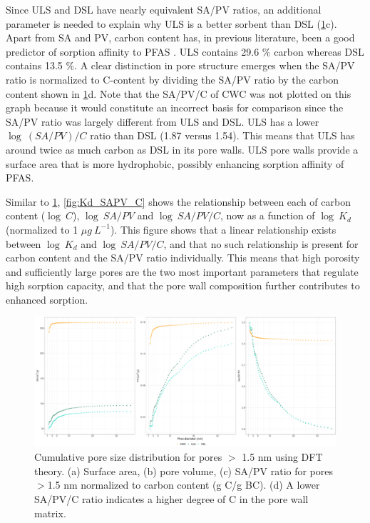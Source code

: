 Since ULS and DSL have nearly equivalent SA/PV ratios, an additional parameter is needed to explain why ULS is a better sorbent than DSL (\cref{fig:PZD_large}c). Apart from SA and PV, carbon content has, in previous literature, been a good predictor of sorption affinity to PFAS \citep{Hale2016,Cornelissen2005}. ULS contains 29.6 \% carbon whereas DSL contains 13.5 \%. A clear distinction in pore structure emerges when the SA/PV ratio is normalized to C-content by dividing the SA/PV ratio by the carbon content shown in \cref{fig:PZD_large}d. Note that the SA/PV/C of CWC was not plotted on this graph because it would constitute an incorrect basis for comparison since the SA/PV ratio was largely different from ULS and DSL. ULS has a lower $\log~(SA/PV)/C$ ratio than DSL (1.87 versus 1.54). This means that ULS has around twice as much carbon as DSL in its pore walls. ULS pore walls provide a surface area that is more hydrophobic, possibly enhancing sorption affinity of PFAS. 

Similar to \cref{fig:PZD_large}, \cref{fig:Kd_SAPV_C} shows the relationship between each of carbon content ($\log~C$), $\log~SA/PV$ and $\log~SA/PV/C$, now as a function of $\log~K_d$ (normalized to 1 $\mu g~L^{-1}$). This figure shows that a linear relationship exists between $\log~K_d$ and $\log~SA/PV/C$, and that no such relationship is present for carbon content and the SA/PV ratio individually. This means that high porosity and sufficiently large pores are the two most important parameters that regulate high sorption capacity, and that the pore wall composition further contributes to enhanced sorption. 

\begin{figure}[htb]
    \centering
    \includegraphics[width=\textwidth]{R/figs/PZD_SAPV_C_large.pdf}
    \caption{Cumulative pore size distribution for pores $>$ 1.5 nm using DFT theory. (a) Surface area, (b) pore volume, (c) SA/PV ratio for pores $>$1.5 nm normalized to carbon content (g C/g BC). (d) A lower SA/PV/C ratio indicates a higher degree of C in the pore wall matrix.}
    \label{fig:PZD_large}
\end{figure}

